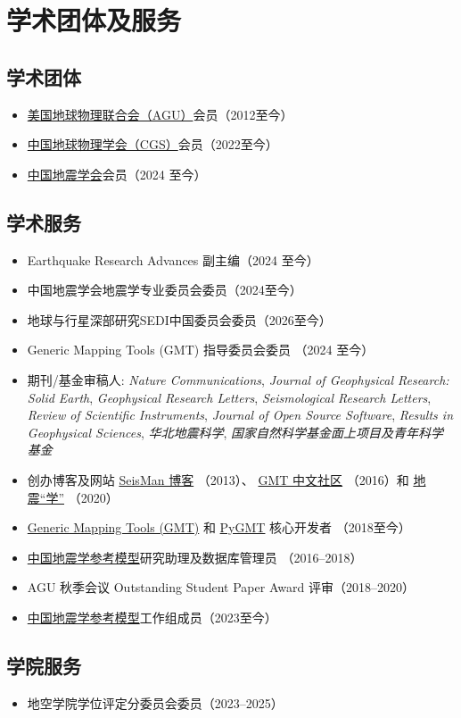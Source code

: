 \section{学术团体及服务}

\subsection{学术团体}
\begin{itemize}
\item \href{https://sites.agu.org/}{美国地球物理联合会（AGU）}会员（2012至今）
\item \href{http://www.cgscgs.org.cn/}{中国地球物理学会（CGS）}会员（2022至今）
\item \href{https://www.ssoc.org.cn/}{中国地震学会}会员（2024 至今）
\end{itemize}

\subsection{学术服务}
\begin{itemize}
\item Earthquake Research Advances 副主编（2024 至今）
\item 中国地震学会地震学专业委员会委员（2024至今）
\item 地球与行星深部研究SEDI中国委员会委员（2026至今）
\item Generic Mapping Tools (GMT) 指导委员会委员 （2024 至今）
\item 期刊/基金审稿人:
      \emph{Nature Communications},
      \emph{Journal of Geophysical Research: Solid Earth},
      \emph{Geophysical Research Letters},
      \emph{Seismological Research Letters},
      \emph{Review of Scientific Instruments},
      \emph{Journal of Open Source Software},
      \emph{Results in Geophysical Sciences},
      \emph{华北地震科学},
      \emph{国家自然科学基金面上项目及青年科学基金}
\item 创办博客及网站
      \href{https://blog.seisman.info}{SeisMan 博客} （2013）、
      \href{http://gmt-china.org/}{GMT 中文社区} （2016）和
      \href{https://seismo-learn.org/}{地震``学''} （2020）
\item \href{https://github.com/GenericMappingTools/gmt}{Generic Mapping Tools (GMT)} 和
      \href{https://github.com/GenericMappingTools/pygmt}{PyGMT} 核心开发者 （2018至今）
\item \href{http://chinageorefmodel.org/}{中国地震学参考模型}研究助理及数据库管理员 （2016--2018）
\item AGU 秋季会议 Outstanding Student Paper Award 评审（2018--2020）
\item \href{http://chinageorefmodel.org/}{中国地震学参考模型}工作组成员（2023至今）
\end{itemize}

\subsection{学院服务}
\begin{itemize}
\item 地空学院学位评定分委员会委员（2023--2025）
\end{itemize}
